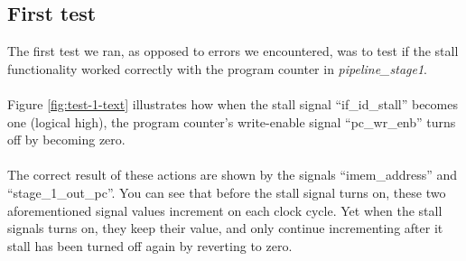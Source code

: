 \subsection{First test}

The first test we ran, as opposed to errors we encountered, was to test if the
stall functionality worked correctly with the program counter in \emph{
pipeline\_stage1}.
\paragraph*{}
Figure \ref{fig:test-1-text} illustrates how when the stall signal
``if\_id\_stall'' becomes one (logical high), the program counter's write-enable
signal ``pc\_wr\_enb'' turns off by becoming zero.
\paragraph*{}
The correct result of these actions are shown by the signals ``imem\_address''
and ``stage\_1\_out\_pc''. You can see that before the stall signal turns on,
these two aforementioned signal values increment on each clock cycle. Yet when
the stall signals turns on, they keep their value, and only continue
incrementing after it stall has been turned off again by reverting to zero.
